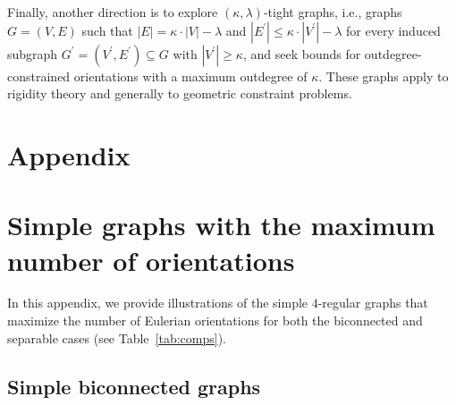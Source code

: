 \documentclass{article}
\begin{document}
        Finally, another direction is to explore $(\kappa, \lambda)$-tight graphs, i.e., graphs $G=(V,E)$ such that $|E|=\kappa \cdot |V|-\lambda$ and $|E^\prime| \leq \kappa \cdot |V^\prime|-\lambda$ for every induced subgraph $G^\prime=(V^\prime,E^\prime) \subseteq G$ with $|V^\prime| \geq \kappa$, and seek bounds for outdegree-constrained orientations with a maximum outdegree of $\kappa$.
        These graphs apply to rigidity theory and generally to geometric constraint problems.
	
	
	
    
    
    \newpage
    
    \appendix

    \section*{Appendix}
    \section{Simple graphs with the maximum number of orientations}\label{app:simple}

        In this appendix, we provide illustrations of the simple $4$-regular graphs that maximize the number of Eulerian orientations for both the biconnected and separable cases (see Table~\ref{tab:comps}).

    \subsection{Simple biconnected graphs}\label{app:simple_bi}
\end{document}
